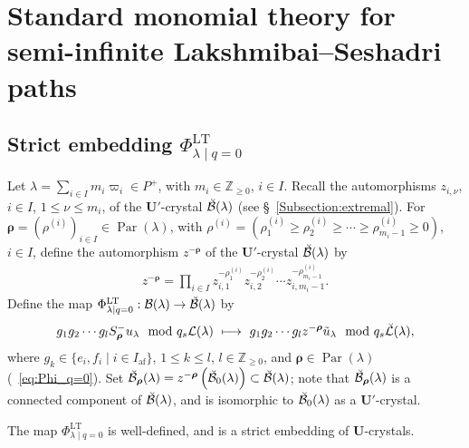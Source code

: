 \documentclass[ALCO,ThmDefs,Unicode,epreuves]{cedram}
\newcommand{\BZ}{\mathbb{Z}}
\newcommand\bmrho[1]{\boldsymbol{#1}}
\renewcommand{\U}{\mathbf{U}}
\DeclareMathOperator{\af}{af}
\DeclareMathOperator{\LT}{LT}
\DeclareMathOperator{\Par}{Par}
\begin{document}
\section{Standard monomial theory for semi-infinite Lakshmibai--Seshadri paths} \label{Section:SMT}

\subsection{Strict embedding \texorpdfstring{$\Phi_{\lambda \mid q=0}^{\LT }$}{Phi lambda|q=0 LT}} \label{Subsection:LT}

Let 
$\lambda = \sum_{i \in I} m_i \varpi_i \in P^+$, 
with 
$m_i \in \BZ_{\geq 0}$, 
$i \in I$. 
Recall the automorphisms 
$z_{i,\nu}$, 
$i \in I$, $1 \leq \nu \leq m_i$, 
of the $\U'$-crystal
$\Breve{\mathcal{B}}(\lambda)$
(see \S~\ref{Subsection:extremal}). 
For 
$\bmrho{\rho} = (\rho^{(i)})_{i \in I} \in \Par (\lambda)$, 
with 
$\rho^{(i)} = (\rho^{(i)}_1 \geq \rho^{(i)}_2 \geq \cdots \geq \rho^{(i)}_{m_i -1} \geq 0)$, 
$i \in I$, 
define the automorphism 
$z^{-\bmrho{\rho}}$ 
of the $\U'$-crystal 
$\Breve{\mathcal{B}}(\lambda)$
by
\begin{align}
z^{-\bmrho{\rho}}
= 
\prod_{i \in I}
z_{i,1}^{- \rho^{(i)}_1} 
z_{i,2}^{- \rho^{(i)}_2}
\cdots 
z_{i,m_i-1}^{- \rho^{(i)}_{m_i-1}} .
\end{align}
Define the map
$\Phi_{\lambda \mid q=0}^{\LT } : 
\mathcal{B}(\lambda) \rightarrow 
\Breve{\mathcal{B}}(\lambda)$
by 
\begin{align} \label{eq:LT} 
g_1 g_2 \cdots g_l S_{\bmrho{\rho}}^- u_{\lambda} 
\mod q_s \mathcal{L}(\lambda) 
\ \longmapsto \ 
g_1 g_2 \cdots g_l z^{-\bmrho{\rho}} \Tilde{u}_{\lambda} 
\mod q_s \Breve{\mathcal{L}}(\lambda) ,
\end{align}
where 
$g_k \in \{ e_i , f_i \mid i \in I_{\af} \}$, 
$1 \leq k \leq l$, 
$l \in \BZ_{\geq 0}$, and 
$\bmrho{\rho} \in \Par (\lambda)$ 
(\cf~\eqref{eq:Phi_q=0}). 
Set 
$\Breve{\mathcal{B}}_{\bmrho{\rho}}(\lambda)
=
z^{-\bmrho{\rho}} \left( \Breve{\mathcal{B}}_0(\lambda) \right)
\subset \Breve{\mathcal{B}}(\lambda)$; 
note that
$\Breve{\mathcal{B}}_{\bmrho{\rho}}(\lambda)$
is a connected component of 
$\Breve{\mathcal{B}}(\lambda)$, 
and is isomorphic to
$\Breve{\mathcal{B}}_0(\lambda)$
as a $\U'$-crystal.

\begin{lemm} \label{lem:Phi_LT}
The map 
$\Phi_{\lambda \mid q=0}^{\LT }$ 
is well-defined, and is a strict embedding of $\U$-crystals.
\end{lemm}
\end{document}
